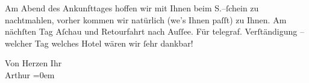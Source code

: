 \pstart
           Am Abend des Ankunfttages hoffen wir mit Ihnen beim S.–ſchein zu nachtmahlen, vorher kommen wir natürlich (we{\geminationn}’s Ihnen paſſt) zu Ihnen. Am nächſten Tag Aſchau und Retourfahrt nach Auſſee. Für telegraf. Verſtändigung – welcher Tag welches Hotel
               wären wir ſehr dankbar!\pend
           
\pstart
           Von Herzen Ihr{\\[\baselineskip]}\spacefill\mbox{Arthur}\pend
           \leftskip=0em{}\endnumbering{}  
      
